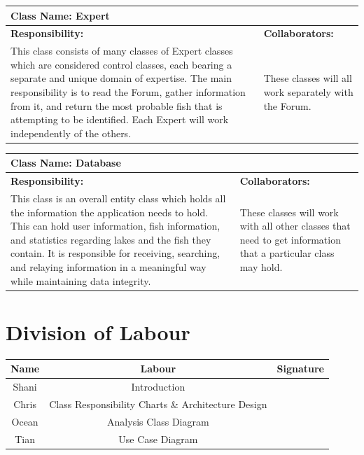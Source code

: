 \documentclass[]{article}
\begin{document}
	\begin{table}[ht]
		\centering
		\begin{tabular}{|p{5cm}|p{5cm}|}
		\hline
		 \multicolumn{2}{|l|}{\textbf{Class Name: Expert}} \\
		\hline
		\textbf{Responsibility:} & \textbf{Collaborators:} \\ \hline
		This class consists of many classes of Expert classes which are considered control classes, each bearing a separate and unique domain of expertise. The main responsibility is to read the Forum, gather information from it, and return the most probable fish that is attempting to be identified. Each Expert will work independently of the others. & These classes will all work separately with the Forum. \\
		\hline
		\end{tabular}
	\end{table}

	\begin{table}[ht]
		\centering
		\begin{tabular}{|p{5cm}|p{5cm}|}
		\hline
		 \multicolumn{2}{|l|}{\textbf{Class Name: Database}} \\
		\hline
		\textbf{Responsibility:} & \textbf{Collaborators:} \\
		\hline
		This class is an overall entity class which holds all the information the application needs to hold. This can hold user information, fish information, and statistics regarding lakes and the fish they contain. It is responsible for receiving, searching, and relaying information in a meaningful way while maintaining data integrity. & These classes will work with all other classes that need to get information that a particular class may hold. \\
		\hline
		\end{tabular}
	\end{table}

\FloatBarrier

\appendix
\section{Division of Labour}
\label{sec:division_of_labour}
\begin{center}
\begin{tabular}{ |c|c|c| }
 \hline
 Name & Labour & Signature              \\ \hline
 Shani & Introduction & \\
 Chris & Class Responsibility Charts \& Architecture Design &  \\
 Ocean & Analysis Class Diagram &  \\
 Tian & Use Case Diagram & \\
 \hline
\end{tabular}
\end{center}

\newpage

\listoffigures
\end{document}
